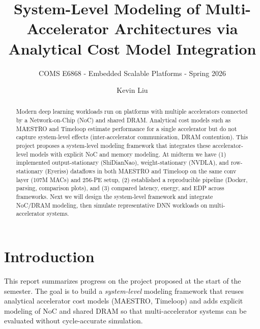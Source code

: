 \documentclass[10pt,sigconf,nonacm]{acmart}
\begin{document}
\title{System-Level Modeling of Multi-Accelerator Architectures via Analytical Cost Model Integration}
\subtitle{\normalsize COMS E6868 - Embedded Scalable Platforms - Spring 2026}

\author{Kevin Liu}

\renewcommand{\shortauthors}{K. Liu}

\begin{abstract}
Modern deep learning workloads run on platforms with multiple accelerators connected by a Network-on-Chip (NoC) and shared DRAM. Analytical cost models such as MAESTRO and Timeloop estimate performance for a single accelerator but do not capture system-level effects (inter-accelerator communication, DRAM contention). This project proposes a system-level modeling framework that integrates these accelerator-level models with explicit NoC and memory modeling. At midterm we have (1) implemented output-stationary (ShiDianNao), weight-stationary (NVDLA), and row-stationary (Eyeriss) dataflows in both MAESTRO and Timeloop on the same conv layer (107M MACs) and 256-PE setup, (2) established a reproducible pipeline (Docker, parsing, comparison plots), and (3) compared latency, energy, and EDP across frameworks. Next we will design the system-level framework and integrate NoC/DRAM modeling, then simulate representative DNN workloads on multi-accelerator systems.
\end{abstract}

\maketitle

\section{Introduction}
\label{sec:intro}

This report summarizes progress on the project proposed at the start of the semester. The goal is to build a \emph{system-level} modeling framework that reuses analytical accelerator cost models (MAESTRO, Timeloop) and adds explicit modeling of NoC and shared DRAM so that multi-accelerator systems can be evaluated without cycle-accurate simulation.
\end{document}
